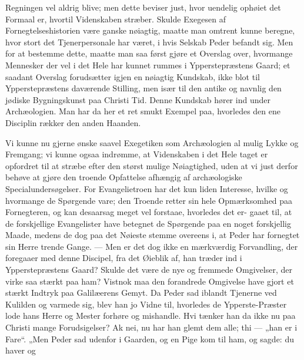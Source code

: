 \documentclass[12pt,a4paper]{book}
\begin{document}
Regningen vel aldrig blive; men dette beviser just, hvor uendelig ophøiet det Formaal er,
hvortil Videnskaben stræber. Skulde Exegesen af Fornegtelseshistorien være ganske
nøiagtig, maatte man omtrent kunne beregne, hvor stort det Tjenerpersonale har været, i
hvis Selskab Peder befandt sig. Men for at bestemme dette, maatte man saa først gjøre et
Overslag over, hvormange Mennesker der vel i det Hele har kunnet rummes i
Ypperstepræstens Gaard; et saadant Overslag forudsætter igjen en nøiagtig Kundskab, ikke
blot til Ypperstepræstens daværende Stilling, men især til den antike og navnlig den
jødiske Bygningskunst paa Christi Tid. Denne Kundskab hører ind under Archæologien. Man
har da her et ret smukt Exempel paa, hvorledes den ene Disciplin rækker den anden
Haanden.

Vi kunne nu gjerne ønske saavel Exegetiken som Archæologien al mulig Lykke og Fremgang; vi
kunne ogsaa indrømme, at Videnskaben i det Hele taget er opfordret til at stræbe efter den
størst mulige Nøiagtighed, uden at vi just derfor behøve at gjøre den troende Opfattelse
afhængig af archæologiske Specialundersøgelser. For Evangelietroen har det kun liden
Interesse, hvilke og hvormange de Spørgende vare; den Troende retter sin hele
Opmærksomhed paa Fornegteren, og kan desaarsag meget vel forstaae, hvorledes det er-
gaaet til, at de forskjellige Evangelister have betegnet de Spørgende paa en noget
forskjellig Maade, medens de dog paa det Nøieste stemme overeens i, at Peder har fornegtet
sin Herre trende Gange. --- Men er det dog ikke en mærkværdig Forvandling, der foregaaer
med denne Discipel, fra det Øieblik af, han træder ind i Ypperstepræstens Gaard? Skulde
det være de nye og fremmede Omgivelser, der virke saa stærkt paa ham? Vistnok maa den
forandrede Omgivelse have gjort et stærkt Indtryk paa Galilæerens Gemyt. Da Peder sad
iblandt Tjenerne ved Kulilden og varmede sig, blev han jo Vidne til, hvorledes de
Ypperste-Præster lode hans Herre og Mester forhøre og mishandle. Hvi tænker han da ikke nu
paa Christi mange Forudsigelser? Ak nei, nu har han glemt dem alle; thi --- „han er i
Fare“. „Men Peder sad udenfor i Gaarden, og en Pige kom til ham, og sagde: du haver og
\end{document}
